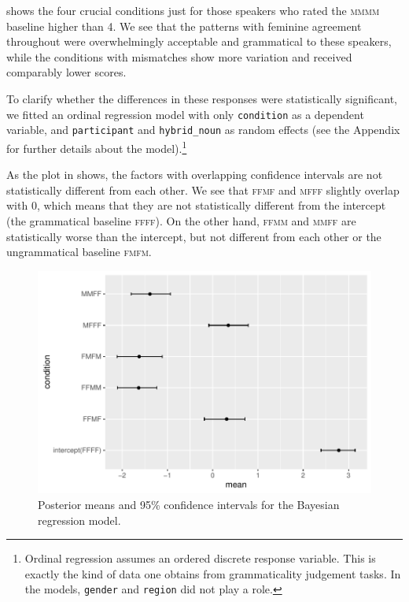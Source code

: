 \documentclass[output=paper,
modfonts,
newtxmath,
hidelinks
]{langscibook}
\begin{document}
 shows the four crucial conditions just for those speakers who rated the \textsc{mmmm} baseline higher than 4. We see that the patterns with feminine agreement throughout were overwhelmingly acceptable and grammatical to these speakers, while the conditions with mismatches show more variation and received comparably lower scores.

To clarify whether the differences in these responses  were statistically significant, we fitted an ordinal regression model with only \texttt{condition} as a dependent variable, and \texttt{participant} and \texttt{hybrid\_noun} as random effects (see the Appendix for further details about the model).\footnote{Ordinal regression assumes an ordered discrete response variable. This is exactly the kind of data one obtains from grammaticality judgement tasks. In the models, \texttt{gender} and \texttt{region} did not play a role.}		
 
 
As the plot in  shows, the factors with overlapping confidence intervals are not statistically different from each other. 
 We see that \textsc{ffmf} and \textsc{mfff} slightly overlap with 0, which means that they are not statistically different from the intercept (the grammatical baseline \textsc{ffff}). 		
On the other hand, \textsc{ffmm} and \textsc{mmff} are statistically worse than the intercept, but not different from each other or the ungrammatical baseline \textsc{fmfm}.%

\begin{figure}[h]
	\centering
	\includegraphics[height=.35\textheight]{figures/14model-plot.pdf}
	\caption{Posterior means and 95\% confidence intervals for the Bayesian regression model.}
	\label{14:fig:postmeans}
\end{figure}
\end{document}
